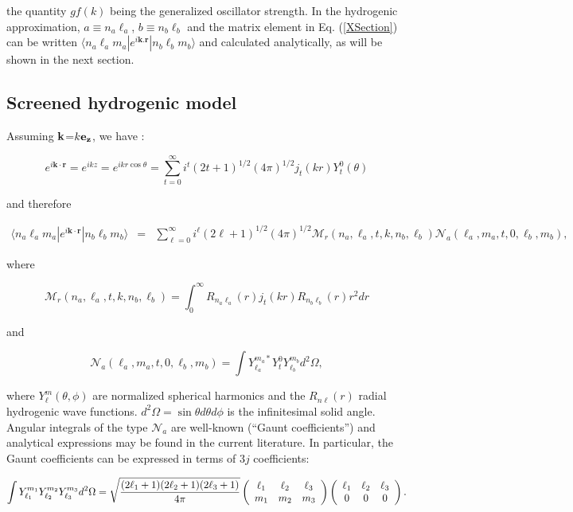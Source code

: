 \documentclass[a4paper,10pt]{article}
\begin{document}
\noindent the quantity $gf(k)$ being the generalized oscillator strength. In the hydrogenic approximation, $a\equiv n_a\ell_a$, $b\equiv n_b\ell_b$ and the matrix element in Eq. (\ref{XSection}) can be written $\langle n_a\ell_a m_a|e^{i\textbf{k}.\textbf{r}}|n_b\ell_bm_b\rangle$ and calculated analytically, as will be shown in the next section.

\subsection{Screened hydrogenic model}\label{subsec22}

Assuming $\bf{k}$=$k\bf{e}_z$, we have :

\begin{equation*}
e^{i\textbf{k}\cdot\textbf{r}}=e^{ikz}=e^{ikr\cos\theta}=\sum_{t=0}^{\infty}i^{t}(2t+1)^{1/2}(4\pi)^{1/2}j_{t}(kr)Y_{t}^0(\theta)
\end{equation*}

\noindent and therefore

\begin{eqnarray}\label{sum}
\langle n_a\ell_a m_a|e^{i\textbf{k}\cdot\textbf{r}}|n_b\ell_bm_b\rangle&=&\sum_{\ell=0}^{\infty}i^{\ell}(2\ell+1)^{1/2}(4\pi)^{1/2}\mathcal{M}_r(n_a,\ell_a,t,k,n_b,\ell_b)\mathcal{N}_a(\ell_a,m_a,t,0,\ell_b,m_b),
\end{eqnarray}

\noindent where

\begin{equation*}
\mathcal{M}_r(n_a,\ell_a,t,k,n_b,\ell_b)=\int_0^{\infty}R_{n_a\ell_a}(r)j_{t}(kr)R_{n_b\ell_b}(r)r^2dr
\end{equation*}

\noindent and

\begin{equation*}
\mathcal{N}_a(\ell_a,m_a,t,0,\ell_b,m_b)=\int Y_{\ell_a}^{m_a*}Y_{t}^0Y_{\ell_b}^{m_b}d^2\Omega,
\end{equation*}


where $Y_{\ell}^{m}(\theta,\phi)$ are normalized spherical harmonics and the $R_{n\ell}(r)$ radial hydrogenic wave functions. $d^2\Omega=\sin\theta d\theta d\phi$ is the infinitesimal solid angle. Angular integrals of the type $\mathcal{N}_a$ are well-known (``Gaunt coefficients'') and analytical expressions may be found in the current literature. In particular, the Gaunt coefficients can be expressed in terms of $3j$ coefficients:

\begin{equation*}
\int Y_{\ell_1}^{m_1}Y_{\ell_2}^{m_2} Y_{\ell_3}^{m_3}d^2\Omega=\sqrt{\frac{(2\ell_1+1)(2\ell_2+1)(2\ell_3+1)}{4\pi}}\left(\begin{array}{ccc}\ell_1 & \ell_2 & \ell_3 \\ m_1 & m_2 & m_3 \end{array}\right)\left(\begin{array}{ccc}\ell_1 & \ell_2 & \ell_3 \\ 0 & 0 & 0 \end{array}\right).
\end{equation*}
\end{document}
